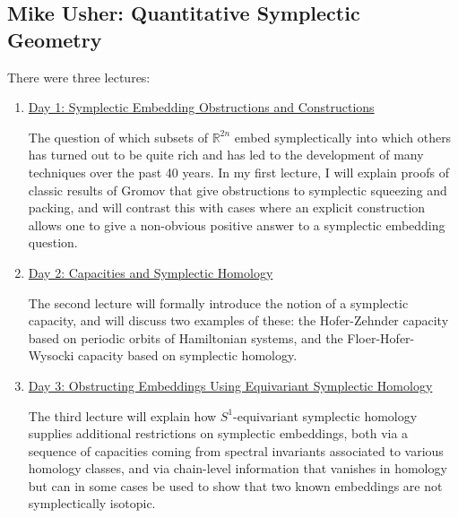 % 
%
%

\begin{partbacktext}
\part{Mike Usher: Quantitative Symplectic Geometry}

There were three lectures:\\

\begin{enumerate}

    \item \href{#u1}{Day 1: Symplectic Embedding Obstructions and Constructions}

    The question of which subsets of $\mathbb{R}^{2n}$ embed symplectically into which others has turned out to be quite rich and has led to the development of many techniques over the past 40 years. In my first lecture, I will explain proofs of classic results of Gromov that give obstructions to symplectic squeezing and packing, and will contrast this with cases where an explicit construction allows one to give a non-obvious positive answer to a symplectic embedding question.

    \item \href{#u2}{Day 2: Capacities and Symplectic Homology}

    The second lecture will formally introduce the notion of a symplectic capacity, and will discuss two examples of these: the Hofer-Zehnder capacity based on periodic orbits of Hamiltonian systems, and the Floer-Hofer-Wysocki capacity based on symplectic homology.
    
    \item \href{#u3}{Day 3: Obstructing Embeddings Using Equivariant Symplectic Homology}

    The third lecture will explain how $S^1$-equivariant symplectic homology supplies additional restrictions on symplectic embeddings, both via a sequence of capacities coming from spectral invariants associated to various homology classes, and via chain-level information that vanishes in homology but can in some cases be used to show that two known embeddings are not symplectically isotopic.

\end{enumerate}

\end{partbacktext}
